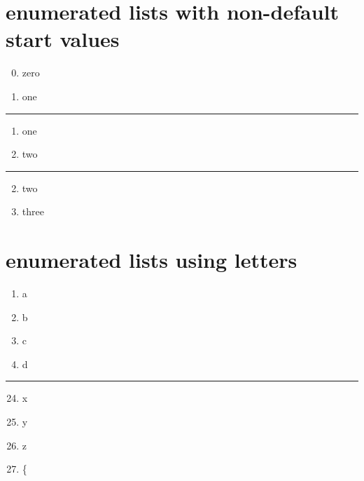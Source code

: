 \documentclass[letterpaper,10pt,english]{sphinxmanual}
\begin{document}
\section{enumerated lists with non-default start values}
\label{lists:enumerated-lists-with-non-default-start-values}\begin{enumerate}
\setcounter{enumi}{-1}
\item {} 
zero

\item {} 
one

\end{enumerate}


\bigskip\hrule{}\bigskip

\begin{enumerate}
\item {} 
one

\item {} 
two

\end{enumerate}


\bigskip\hrule{}\bigskip

\begin{enumerate}
\setcounter{enumi}{1}
\item {} 
two

\item {} 
three

\end{enumerate}


\section{enumerated lists using letters}
\label{lists:enumerated-lists-using-letters}\begin{enumerate}
\item {} 
a

\item {} 
b

\item {} 
c

\item {} 
d

\end{enumerate}


\bigskip\hrule{}\bigskip

\begin{enumerate}
\setcounter{enumi}{23}
\item {} 
x

\item {} 
y

\item {} 
z

\item {} 
\{

\end{enumerate}
\end{document}
